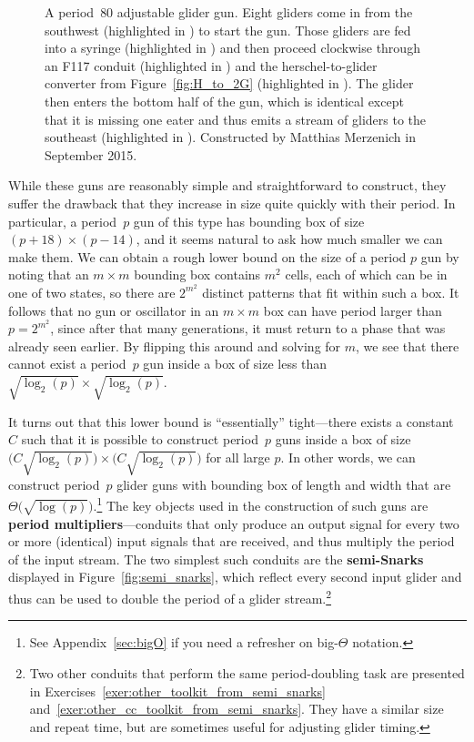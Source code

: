 \begin{figure}[!htb]
	\centering
	\caption{A period~$80$ adjustable glider gun. Eight gliders come in from the southwest (highlighted in ) to start the gun. Those gliders are fed into a syringe (highlighted in ) and then proceed clockwise through an F117 conduit (highlighted in ) and the herschel-to-glider converter from Figure~\ref{fig:H_to_2G} (highlighted in ). The glider then enters the bottom half of the gun, which is identical except that it is missing one eater and thus emits a stream of gliders to the southeast (highlighted in ). Constructed by Matthias Merzenich in September 2015.}\label{fig:p80_adjustable_gun}
\end{figure}

While these guns are reasonably simple and straightforward to construct, they suffer the drawback that they increase in size quite quickly with their period. In particular, a period~$p$ gun of this type has bounding box of size $(p+18) \times (p-14)$, and it seems natural to ask how much smaller we can make them. We can obtain a rough lower bound on the size of a period $p$ gun by noting that an $m \times m$ bounding box contains $m^2$ cells, each of which can be in one of two states, so there are $2^{m^2}$ distinct patterns that fit within such a box. It follows that no gun or oscillator in an $m \times m$ box can have period larger than $p = 2^{m^2}$, since after that many generations, it must return to a phase that was already seen earlier. By flipping this around and solving for $m$, we see that there cannot exist a period~$p$ gun inside a box of size less than $\sqrt{\log_2(p)} \times \sqrt{\log_2(p)}$.

It turns out that this lower bound is ``essentially'' tight---there exists a constant $C$ such that it is possible to construct period~$p$ guns inside a box of size $\big(C\sqrt{\log_2(p)}\big) \times \big(C\sqrt{\log_2(p)}\big)$ for all large $p$. In other words, we can construct period~$p$ glider guns with bounding box of length and width that are $\Theta\big(\sqrt{\log(p)}\big)$.\footnote{See Appendix~\ref{sec:bigO} if you need a refresher on big-$\Theta$ notation.} The key objects used in the construction of such guns are \textbf{period multipliers}---conduits that only produce an output signal for every two or more (identical) input signals that are received, and thus multiply the period of the input stream. The two simplest such conduits are the \textbf{semi-Snarks} displayed in Figure~\ref{fig:semi_snarks}, which reflect every second input glider and thus can be used to double the period of a glider stream.\footnote{Two other conduits that perform the same period-doubling task are presented in Exercises~\ref{exer:other_toolkit_from_semi_snarks} and~\ref{exer:other_cc_toolkit_from_semi_snarks}. They have a similar size and repeat time, but are sometimes useful for adjusting glider timing.}

